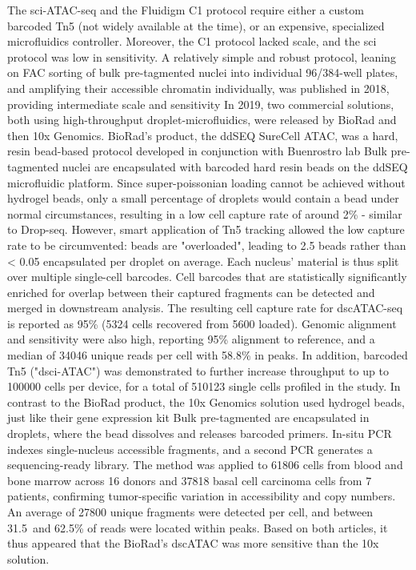 The sci-ATAC-seq and the Fluidigm C1 protocol require either a custom barcoded Tn5 (not widely available at the time), or an expensive, specialized microfluidics controller. Moreover, the C1 protocol lacked scale, and the sci protocol was low in sensitivity. A relatively simple and robust protocol, leaning on FAC sorting of bulk pre-tagmented nuclei into individual 96/384-well plates, and amplifying their accessible chromatin individually, was published in 2018, providing intermediate scale and sensitivity In 2019, two commercial solutions, both using high-throughput droplet-microfluidics, were released by BioRad and then 10x Genomics. BioRad's product, the ddSEQ SureCell ATAC, was a hard, resin bead-based protocol developed in conjunction with Buenrostro lab Bulk pre-tagmented nuclei are encapsulated with barcoded hard resin beads on the ddSEQ microfluidic platform. Since super-poissonian loading cannot be achieved without hydrogel beads, only a small percentage of droplets would contain a bead under normal circumstances, resulting in a low cell capture rate of around 2\% - similar to Drop-seq. However, smart application of Tn5 tracking allowed the low capture rate to be circumvented: beads are "overloaded", leading to 2.5 beads rather than < 0.05 encapsulated per droplet on average. Each nucleus' material is thus split over multiple single-cell barcodes. Cell barcodes that are statistically significantly enriched for overlap between their captured fragments can be detected and merged in downstream analysis. The resulting cell capture rate for dscATAC-seq is reported as 95\% (\num{5324} cells recovered from \num{5600} loaded). Genomic alignment and sensitivity were also high, reporting 95\% alignment to reference, and a median of \num{34046} unique reads per cell with \num{58.8}\% in peaks. In addition, barcoded Tn5 ("dsci-ATAC") was demonstrated to further increase throughput to up to \num{100000} cells per device, for a total of \num{510123} single cells profiled in the study. In contrast to the BioRad product, the 10x Genomics solution used hydrogel beads, just like their gene expression kit Bulk pre-tagmented are encapsulated in droplets, where the bead dissolves and releases barcoded primers. In-situ PCR indexes single-nucleus accessible fragments, and a second PCR generates a sequencing-ready library. The method was applied to \num{61806} cells from blood and bone marrow across 16 donors and \num{37818} basal cell carcinoma cells from 7 patients, confirming tumor-specific variation in accessibility and copy numbers. An average of \num{27800} unique fragments were detected per cell, and between 31.5\ and 62.5\% of reads were located within peaks. Based on both articles, it thus appeared that the BioRad's dscATAC was more sensitive than the 10x solution.

